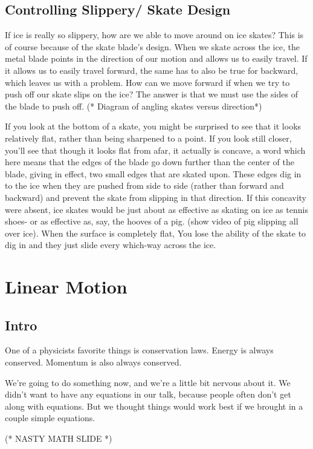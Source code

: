 \documentclass[12pt]{article}
\begin{document}
\subsection{Controlling Slippery/ Skate Design}
If ice is really so slippery, how are we able to move around on ice skates? This is 
of course because of the skate blade's design. When we skate across the ice, the metal blade
points in the direction of our motion and allows us to easily travel. If it allows us to easily 
travel forward, the same has to also be true for backward, which leaves us with a problem. 
How can we move forward if when we try to push off our skate slips on the ice? The answer
is that we must use the sides of the blade to push off. (* Diagram of angling skates versus 
direction*) 

If you look at the bottom of a skate, you might be surprised to see that it looks relatively
flat, rather than being sharpened to a point. If you look still closer, you'll see that 
though it looks flat from afar, it actually is concave, a word which here means that the
edges of the blade go down further than the center of the blade, giving in effect, two small 
edges that are skated upon. These edges dig in to the ice when they are pushed from side
to side (rather than forward and backward) and prevent the skate from slipping in that direction. 
If this concavity were absent, ice skates would be just about as
effective as skating on ice as tennis shoes- or as effective as, say, the hooves of a pig.
(show video of pig slipping all over ice). When the surface is completely flat, 
You lose the ability of the skate to dig in
and they just slide every which-way across the ice. 

\section{Linear Motion}
\subsection{Intro}
One of a physicists favorite things is conservation 
laws. Energy is always conserved. Momentum is also always conserved. 

We're going to do something now, and we're a little bit nervous about it.
We didn't want to have any equations in our talk, because people often 
don't get along with equations. But we thought things would work best 
if we brought in a couple simple equations. 

(* NASTY MATH SLIDE *)
\end{document}
